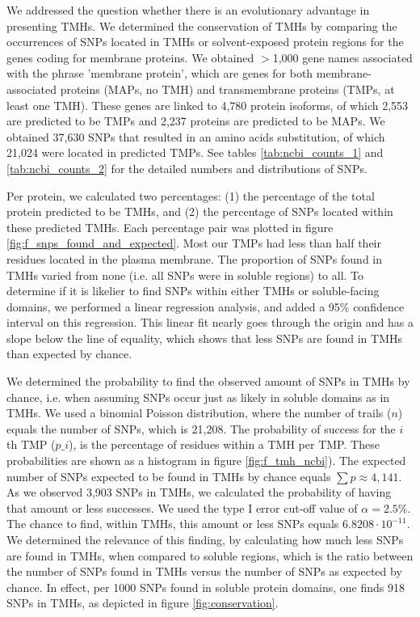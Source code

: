 We addressed the question whether there is an evolutionary advantage in presenting TMHs. We determined the conservation of TMHs by comparing the occurrences of SNPs located in TMHs or solvent-exposed protein regions for the genes coding for membrane proteins.
We obtained $>$1,000 gene names associated with the phrase 'membrane protein',
which are genes for both membrane-associated proteins (MAPs, no TMH) and 
transmembrane proteins (TMPs, at least one TMH).
These genes are linked to 4,780 protein isoforms, 
of which 2,553 are predicted to be TMPs and 
2,237 proteins are predicted to be MAPs.
We obtained 37,630 SNPs that resulted in an
amino acids substitution, of which 21,024 were located 
in predicted TMPs.
See tables \ref{tab:ncbi_counts_1} and \ref{tab:ncbi_counts_2} 
for the detailed numbers and distributions of SNPs.

Per protein, we calculated two percentages: 
(1) the percentage of the total protein predicted to be TMHs, 
and (2) the percentage of SNPs located within these predicted TMHs.
Each percentage pair was plotted in figure \ref{fig:f_snps_found_and_expected}.
Most our TMPs had less than half their residues located in the 
plasma membrane.
The proportion of SNPs found in TMHs varied from 
none (i.e. all SNPs were in
soluble regions) to all.
To determine if it is likelier to find SNPs within either TMHs or
soluble-facing domains, we performed a linear regression analysis,
and added a 95\% confidence interval on this regression.
This linear fit nearly goes through the origin and has a slope
below the line of equality,
which shows that less SNPs are found in TMHs than expected by chance.

We determined the probability to find the observed amount
of SNPs in TMHs by chance, i.e. when assuming SNPs occur 
just as likely in soluble domains as in TMHs.
We used a binomial Poisson distribution, 
where the number of trails ($n$) equals the number of SNPs, 
which is 21,208. 
The probability of success for the $i$th TMP ($p\_i$), 
is the percentage of residues within a TMH per TMP. 
These probabilities are shown as a histogram 
in figure \ref{fig:f_tmh_ncbi}). 
The expected number of SNPs expected to be found in 
TMHs by chance equals $\sum{p} \approx 4,141$.
As we observed 3,903 SNPs in TMHs, 
we calculated the probability of having that amount or less successes.
We used the type I error cut-off value of $\alpha = 2.5\%$.
The chance to find, within TMHs, this amount or less SNPs 
equals $6.8208 \cdot 10^{-11}$.
We determined the relevance of this finding, by
calculating how much less SNPs are found in TMHs,
when compared to soluble regions, which is the
ratio between the number of SNPs found in TMHs
versus the number of SNPs as expected by chance.
In effect, per 1000 SNPs found in soluble protein domains, 
one finds 918 SNPs in TMHs,
as depicted in figure \ref{fig:conservation}. 


